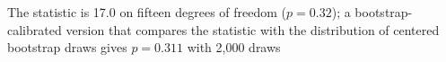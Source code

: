 The statistic is 17.0 on fifteen degrees of freedom ($p = 0.32$); a bootstrap-calibrated version that compares the statistic with the distribution of centered bootstrap draws gives $p = 0.311$ with 2,000 draws%
